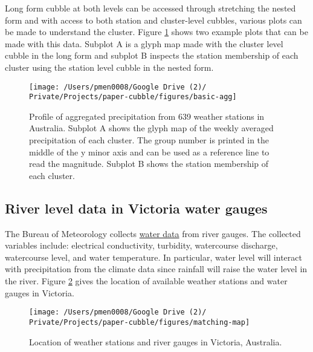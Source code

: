 \documentclass{article}
\begin{document}
Long form cubble at both levels can be accessed through stretching the nested form and with access to both station and cluster-level cubbles, various plots can be made to understand the cluster. Figure \ref{fig:basic-agg} shows two example plots that can be made with this data. Subplot A is a glyph map made with the cluster level cubble in the long form and subplot B inspects the station membership of each cluster using the station level cubble in the nested form.

\begin{figure}
\texttt{[image: /Users/pmen0008/Google Drive (2)/ Private/Projects/paper-cubble/figures/basic-agg]} \caption{Profile of aggregated precipitation from 639 weather stations in Australia. Subplot A shows the glyph map of the weekly averaged precipitation of each cluster. The group number is printed in the middle of the y minor axis and can be used as a reference line to read the magnitude. Subplot B shows the station membership of each cluster.}\label{fig:basic-agg}
\end{figure}

\hypertarget{river-level-data-in-victoria-water-gauges}{%
\subsection{River level data in Victoria water gauges}\label{river-level-data-in-victoria-water-gauges}}

The Bureau of Meteorology collects \href{http://www.bom.gov.au/metadata/catalogue/19115/ANZCW0503900528?template=full}{water data} from river gauges. The collected variables include: electrical conductivity, turbidity, watercourse discharge, watercourse level, and water temperature. In particular, water level will interact with precipitation from the climate data since rainfall will raise the water level in the river. Figure \ref{fig:matching-map} gives the location of available weather stations and water gauges in Victoria.

\begin{figure}
\texttt{[image: /Users/pmen0008/Google Drive (2)/ Private/Projects/paper-cubble/figures/matching-map]} \caption{Location of weather stations and river gauges in Victoria, Australia.}\label{fig:matching-map}
\end{figure}
\end{document}
